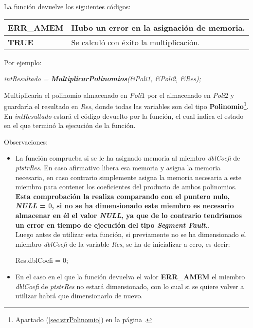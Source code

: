 La funci\'on devuelve los siguientes c\'odigos:

\begin{center}
\begin{tabular}{|l|l|}
\hline
\textbf{ERR\_AMEM} & Hubo un error en la asignaci\'on de memoria. \\
\hline
\textbf{TRUE} & Se calcul\'o con \'exito la multiplicaci\'on. \\
\hline
\end{tabular}
\end{center}

Por ejemplo:

\begin{center}
\emph{intResultado = \textbf{MultiplicarPolinomios}(\&Poli1, \&Poli2, \&Res);}
\end{center}

Multiplicar\'{\i}a el polinomio almacenado en \emph{Poli$1$} por el almacenado
en \emph{Poli$2$} y guardar\'{\i}a el resultado en \emph{Res}, donde todas las
variables son del tipo \textbf{Polinomio}\footnote{Apartado 
(\ref{sec:strPolinomio}) en la p\'agina \pageref{sec:strPolinomio}.}.\\

En \emph{intResultado} estar\'a el c\'odigo devuelto por la funci\'on, el cual
indica el estado en el que termin\'o la ejecuci\'on de la funci\'on.\newline

Observaciones:

\begin{itemize}
\item La funci\'on comprueba si se le ha asignado memoria al miembro 
\emph{dblCoefi} de \emph{ptstrRes}. En caso afirmativo libera esa
memoria y asigna la memoria necesaria, en caso contrario simplemente asigna
la memoria necesaria a este miembro para contener los coeficientes del
producto de ambos polinomios.\\

\textbf{Esta comprobaci\'on la realiza comparando con el puntero nulo, 
\emph{NULL} = $0$, si no se ha dimensionado este miembro es necesario almacenar
en \'el el valor \emph{NULL}, ya que de lo contrario tendr\'{\i}amos un error
en tiempo de ejecuci\'on del tipo \emph{Segment Fault}.}.\\

Luego antes de utilizar esta funci\'on, si previamente no se ha dimensionado
el miembro \emph{dblCoefi} de la variable \emph{Res}, se ha de inicializar
a cero, es decir:

\begin{center}
Res.dblCoefi = 0;
\end{center}
\item En el caso en el que la funci\'on devuelva el valor \textbf{ERR\_AMEM} el
miembro \emph{dblCoefi} de \emph{ptstrRes} no estar\'a dimensionado, con lo
cual si se quiere volver a utilizar habr\'a que dimensionarlo de nuevo.
\end{itemize}

